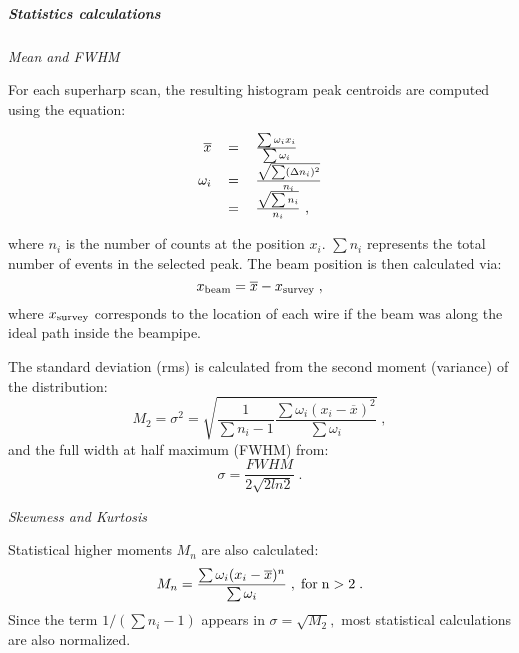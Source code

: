 	\subparagraph{Statistics calculations}

	{\sl Mean and FWHM}

For each superharp scan, the resulting histogram peak centroids are computed using the equation:
\begin{center}
\begin{equation}
\begin{tabular}{rcl}
$\overline{x}$&$ = $&$ \frac{\sum \omega_i x_i}{\sum \omega_i}	$\\
$\omega_i    $&$ = $&$ \frac{\sqrt{\sum (\Delta n_i)^2}}{n_i} $\\
              &$ = $&$ \frac{\sqrt{\sum n_i}}{n_i} $\ ,
\end{tabular}
\end{equation}
\end{center}
\noindent
where $n_i$ is the number of counts at the position $x_i$. $\sum n_i$ represents
the total number of events in the selected peak. The beam position is then calculated via:
\begin{equation}
x_{\rm beam} = \overline{x} - x_{\rm survey} \; ,
\end{equation}
where $x_{\rm survey}$ corresponds to the location of each wire if the beam was along the
ideal path inside the beampipe.

The standard deviation (rms) is calculated from the second moment (variance) of the
distribution:
\begin{equation}
M_2 = \sigma^2 =
	\sqrt{\frac{1}{\sum n_i-1}\frac{\sum \omega_i (x_i-\overline{x})^2}{\sum \omega_i}} \; ,
\end{equation}
and the full width at half maximum (FWHM) from:
\begin{equation}
\sigma = \frac{FWHM}{2\sqrt{2ln2}} \; .
\end{equation}

	{\sl Skewness and Kurtosis}

Statistical higher moments $M_n$ are also calculated:
\begin{equation}
M_n = \frac{\sum \omega_i (x_i-\overline{x})^n}{\sum \omega_i} \; , \; {\rm for \; n>2} \; .
\end{equation}
Since the term $1/(\sum n_i-1)$ appears in $\sigma=\sqrt{M_2},$ most statistical calculations
are also normalized.  

